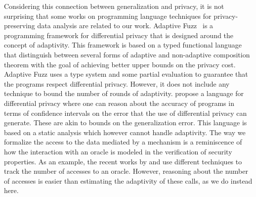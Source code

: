 Considering this connection between generalization and privacy, it is not surprising
that some works on programming language techniques for privacy-preserving data analysis are related to our work. 
Adaptive Fuzz~\cite{Winograd-CortHR17} is a programming framework for differential privacy that is designed around the concept of adaptivity. 
This framework is based on a typed functional language that distinguish between several forms of adaptive and non-adaptive composition theorem with the goal of achieving better upper bounds on the privacy cost.
Adaptive Fuzz uses a type system and some partial evaluation to guarantee that the programs respect differential privacy.
However, it does not include any technique to bound the number of rounds of adaptivity. 
\citet{lobo2021programming} propose a language for differential privacy where one can reason about the accuracy of programs in terms of confidence intervals on the error that the use of differential privacy can generate. These are akin to bounds on the generalization error. This language is based on a static analysis which however cannot handle adaptivity. 
%
The way we formalize the access to the data mediated by a mechanism is a reminiscence of how the interaction with an oracle is modeled in the verification of security properties. As an example, the recent works by \citet{BarbosaBGKS21} and \citet{AguirreBGGKS21} use different techniques to track the number of accesses to an oracle. However, reasoning about the number of accesses is easier than estimating the adaptivity of these calls, as we do instead here.
